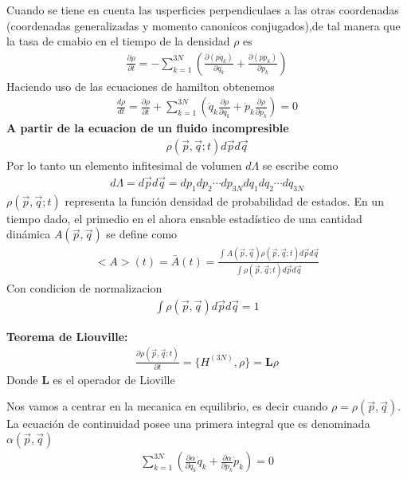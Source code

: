 \documentclass{article}
\begin{document}
Cuando se tiene en cuenta las usperficies perpendiculaes a las otras coordenadas (coordenadas generalizadas y momento canonicos conjugados),de tal manera que la tasa de cmabio en el tiempo de la densidad $ \rho $ es 
\begin{gather*}
  \frac{\partial \rho }{\partial t } = - \displaystyle\sum_{k = 1 }^{3N }\left(\frac{\partial (p\dot q_k ) }{\partial q_k } + \frac{\partial (p \dot p_k ) }{\partial p_k }\right) 
\end{gather*}
Haciendo uso de las ecuaciones de hamilton obtenemos
\begin{gather*}
  \frac{d \rho }{d t } = \frac{\partial \rho }{\partial t } + \displaystyle\sum_{k = 1 }^{3N } \left(\dot q_k \frac{\partial \rho }{\partial q_k } + \dot p_k \frac{\partial \rho }{\partial p_k }\right) = 0  
\end{gather*}
\textbf{A partir de la ecuacion de un fluido incompresible }
\begin{gather*}
  \rho(\vec p, \vec q; t ) d\vec p d \vec q  
\end{gather*}
Por lo tanto un elemento infitesimal de volumen $ d \Lambda $ se escribe como 
\begin{gather*}
  d \Lambda  = d \vec p d \vec q = d p_1 dp_2 \cdots dp _{3N } dq_1 dq_2 \cdots d q _{3N } 
\end{gather*}
$ \rho(\vec p, \vec q;t ) $ representa la función densidad de probabilidad de estados. En un tiempo dado, el primedio en el ahora ensable estadístico de una cantidad dinámica $ A(\vec p, \vec q ) $ se define como 
\begin{gather*}
  <A> (t) = \bar A (t) = \frac{\int_{}^{} A(\vec p, \vec q )\rho(\vec p, \vec q;t ) d\vec p d \vec q }{\int \rho(\vec p, \vec q;t )d\vec p d \vec q} 
\end{gather*}
Con condicion de normalizacion 
\begin{gather*}
  \int\rho(\vec p, \vec q) d\vec p d \vec q = 1  
\end{gather*}

\hfill 

\hfill 

\hfill 

\hfill

\hfill

\textbf{Teorema de Liouville: }
\begin{gather*}
  \frac{\partial \rho(\vec p, \vec q;t ) }{\partial t} = \{H ^ {(3N )},\rho\} = \textbf{L} \rho
\end{gather*}
Donde $ \textbf{L } $es el operador de Lioville

Nos vamos a centrar en la mecanica en equilibrio, es decir cuando $ \rho = \rho(\vec p , \vec q ) $. La ecuación de continuidad posee una primera integral que es denominada $ \alpha(\vec p, \vec q ) $
\begin{gather*}
  \displaystyle\sum_{k = 1 }^{3N } \left(\frac{\partial \alpha }{\partial q_k }\dot q_k + \frac{\partial \alpha }{\partial p_k }\dot p_k \right) = 0  
\end{gather*}
\end{document}
